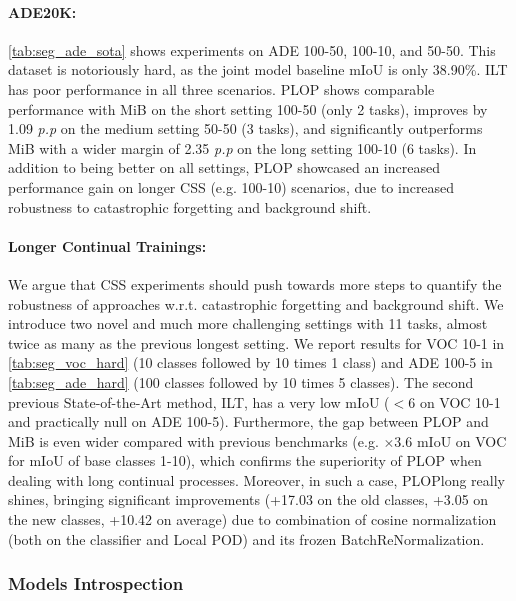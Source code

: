 \paragraph{ADE20K:\,}\autoref{tab:seg_ade_sota} shows experiments on ADE 100-50, 100-10, and
50-50. This dataset is notoriously hard, as the joint model baseline \ac{mIoU} is only 38.90\%. ILT
has poor performance in all three scenarios. PLOP shows comparable performance with MiB on the short
setting 100-50 (only 2 tasks), improves by 1.09 \textit{p.p} on the medium setting 50-50 (3 tasks),
and significantly outperforms MiB with a wider margin of 2.35 \textit{p.p} on the long setting
100-10 (6 tasks). In addition to being better on all settings, PLOP showcased an increased
performance gain on longer \ac{CSS} (e.g. 100-10) scenarios, due to increased robustness to catastrophic
forgetting and background shift.


\paragraph{Longer Continual Trainings:\,}We argue that \ac{CSS} experiments should push towards
more steps
\cite{wortsman2020supermasks,lomonaco2020ar1,douillard2020podnet,castro2018end_to_end_inc_learn} to
quantify the robustness of approaches w.r.t. catastrophic forgetting and background shift. We
introduce two novel and much more challenging settings with 11 tasks, almost twice as many as the
previous longest setting. We report results for VOC 10-1 in \autoref{tab:seg_voc_hard} (10 classes
followed by 10 times 1 class) and ADE 100-5 in \autoref{tab:seg_ade_hard} (100 classes followed by
10 times 5 classes). The second previous State-of-the-Art method, ILT, has a very low \ac{mIoU}
($<6$ on VOC 10-1 and practically null on ADE 100-5). Furthermore, the gap between PLOP and MiB is
even wider compared with previous benchmarks (e.g. $\times$3.6 \ac{mIoU} on VOC for \ac{mIoU} of
base classes 1-10), which confirms the superiority of PLOP when dealing with long continual
processes. Moreover, in such a case, PLOPlong really shines, bringing significant improvements
(+17.03 \pp on the old classes, +3.05 \pp on the new classes, +10.42 \pp on average) due to
combination of cosine normalization (both on the classifier and Local POD) and its frozen
BatchReNormalization.

\subsubsection{Models Introspection}


